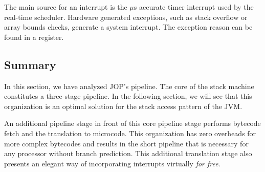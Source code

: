 The main source for an interrupt is the $\mu$s accurate timer
interrupt used by the real-time scheduler. Hardware generated
exceptions, such as stack overflow or array bounds checks, generate
a system interrupt. The exception reason can be found in a register.

\subsection{Summary}

In this section, we have analyzed JOP's pipeline. The core of the
stack machine constitutes a three-stage pipeline. In the following
section, we will see that this organization is an optimal solution
for the stack access pattern of the JVM.

An additional pipeline stage in front of this core pipeline stage
performs bytecode fetch and the translation to microcode. This
organization has zero overheads for more complex bytecodes and
results in the short pipeline that is necessary for any processor
without branch prediction. This additional translation stage also
presents an elegant way of incorporating interrupts virtually
\emph{for free}.
